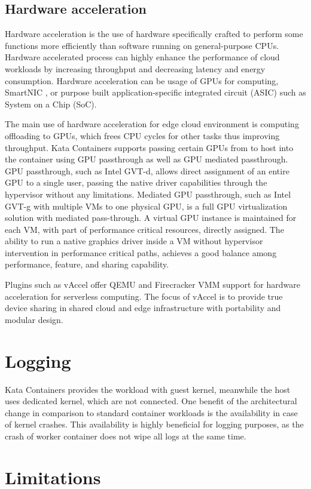 \subsection{Hardware acceleration}

Hardware acceleration is the use of hardware specifically crafted to perform some functions more efficiently than software running on general-purpose CPUs. Hardware accelerated process can highly enhance the performance of cloud workloads by increasing throughput and decreasing latency and energy consumption. Hardware acceleration can be usage of GPUs for computing, SmartNIC \cite{SmartNICIntel}, or purpose built application-specific integrated circuit (ASIC) such as System on a Chip (SoC).

The main use of hardware acceleration for edge cloud environment is computing offloading to GPUs, which frees CPU cycles for other tasks thus improving throughput. Kata Containers supports passing certain GPUs from to host into the container using GPU passthrough as well as GPU mediated passthrough. GPU passthrough, such as Intel GVT-d, allows direct assignment of an entire GPU to a single user, passing the native driver capabilities through the hypervisor without any limitations. Mediated GPU passthrough, such as Intel GVT-g with multiple VMs to one physical GPU, is a full GPU virtualization solution with mediated pass-through. A virtual GPU instance is maintained for each VM, with part of performance critical resources, directly assigned. The ability to run a native graphics driver inside a VM without hypervisor intervention in performance critical paths, achieves a good balance among performance, feature, and sharing capability. \cite{GPUKataContainers}

Plugins such as vAccel \cite{vAccel} offer QEMU and Firecracker VMM support for hardware acceleration for serverless computing. The focus of vAccel is to provide true device sharing in shared cloud and edge infrastructure with portability and modular design.
		
\section{Logging}

Kata Containers provides the workload with guest kernel, meanwhile the host uses dedicated kernel, which are not connected. One benefit of the architectural change in comparison to standard container workloads is the availability in case of kernel crashes. This availability is highly beneficial for logging purposes, as the crash of worker container does not wipe all logs at the same time.

\section{Limitations}